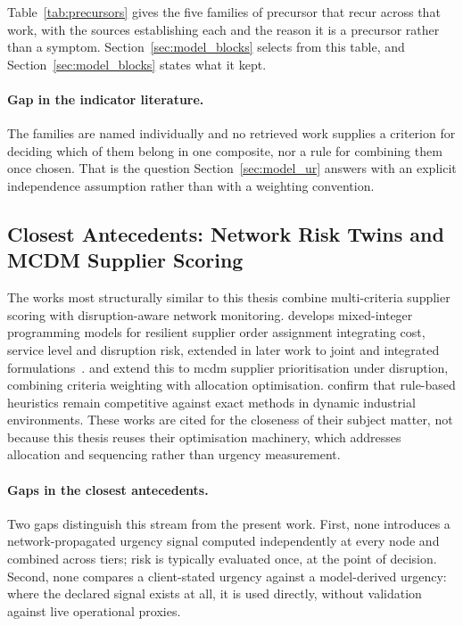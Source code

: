 Table~\ref{tab:precursors} gives the five families of precursor that recur across that work,
with the sources establishing each and the reason it is a precursor rather than a symptom.
Section~\ref{sec:model_blocks} selects from this table, and Section~\ref{sec:model_blocks} states what it kept.

\paragraph{Gap in the indicator literature.}
The families are named individually and no retrieved work supplies a criterion for deciding
which of them belong in one composite, nor a rule for combining them once chosen. That is the
question Section~\ref{sec:model_ur} answers with an explicit independence assumption rather
than with a weighting convention.

\subsection{Closest Antecedents: Network Risk Twins and MCDM Supplier Scoring}
\label{sec:lit_antecedents}

The works most structurally similar to this thesis combine multi-criteria supplier scoring
with disruption-aware network monitoring.
\textcite{sawik2013integrated} develops mixed-integer programming models for resilient
supplier order assignment integrating cost, service level and disruption risk, extended in
later work to joint and integrated
formulations~\autocite{sawik2014joint,sawik2016integrated}. \textcite{cohen2021assigning} and \textcite{afrasiabi2022extended}
extend this to \gls{mcdm} supplier prioritisation under disruption, combining criteria
weighting with allocation optimisation. \textcite{chakrabortty2020efficient} confirm that rule-based heuristics remain
competitive against exact methods in dynamic industrial environments. These works are cited
for the closeness of their subject matter, not because this thesis reuses their
optimisation machinery, which addresses allocation and sequencing rather than urgency
measurement.

\paragraph{Gaps in the closest antecedents.}
Two gaps distinguish this stream from the present work. First, none introduces a
network-propagated urgency signal computed independently at every node and combined across
tiers; risk is typically evaluated once, at the point of decision. Second, none compares a
client-stated urgency against a model-derived urgency: where the declared signal exists at
all, it is used directly, without validation against live operational proxies.

